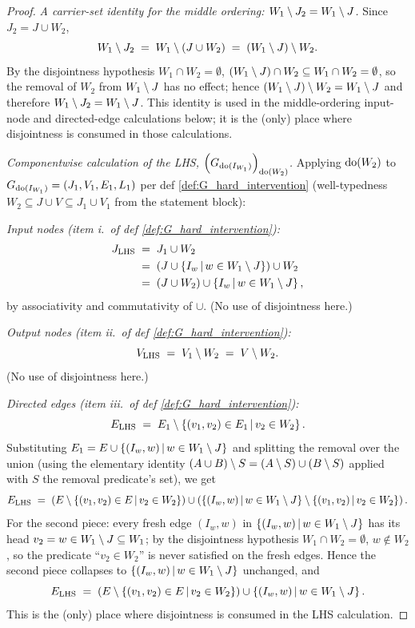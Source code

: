 \documentclass[main]{subfiles}
\begin{document}
\begin{proof}
\smallskip\noindent\emph{A carrier-set identity for the middle ordering: $W_1 \setminus J_2 = W_1 \setminus J$.}
Since $J_2 = J \cup W_2$,
\[
    W_1 \setminus J_2 \;=\; W_1 \setminus (J \cup W_2) \;=\; (W_1 \setminus J) \setminus W_2.
\]
By the disjointness hypothesis $W_1 \cap W_2 = \emptyset$, $(W_1 \setminus J) \cap W_2 \subseteq W_1 \cap W_2 = \emptyset$, so the removal of $W_2$ from $W_1 \setminus J$ has no effect; hence $(W_1 \setminus J) \setminus W_2 = W_1 \setminus J$ and therefore $W_1 \setminus J_2 = W_1 \setminus J$. This identity is used in the middle-ordering input-node and directed-edge calculations below; it is the (only) place where disjointness is consumed in those calculations.

\smallskip\noindent\emph{Componentwise calculation of the LHS, $\left ( G_{\operatorname{do}(I_{W_1})} \right )_{\operatorname{do}(W_2)}$.}
Applying $\operatorname{do}(W_2)$ to $G_{\operatorname{do}(I_{W_1})} = (J_1, V_1, E_1, L_1)$ per def \ref{def:G_hard_intervention} (well-typedness $W_2 \subseteq J \cup V \subseteq J_1 \cup V_1$ from the statement block):

\medskip\noindent\emph{Input nodes (item i.\ of def \ref{def:G_hard_intervention}):}
\begin{align*}
    J_{\mathrm{LHS}}
        &\;=\; J_1 \cup W_2 \\
        &\;=\; \left ( J \cup \left \{ I_w \,\middle|\, w \in W_1 \setminus J \right \} \right ) \cup W_2 \\
        &\;=\; (J \cup W_2) \cup \left \{ I_w \,\middle|\, w \in W_1 \setminus J \right \},
\end{align*}
by associativity and commutativity of $\cup$. (No use of disjointness here.)

\medskip\noindent\emph{Output nodes (item ii.\ of def \ref{def:G_hard_intervention}):}
\[
    V_{\mathrm{LHS}} \;=\; V_1 \setminus W_2 \;=\; V \setminus W_2.
\]
(No use of disjointness here.)

\medskip\noindent\emph{Directed edges (item iii.\ of def \ref{def:G_hard_intervention}):}
\[
    E_{\mathrm{LHS}} \;=\; E_1 \setminus \left \{ (v_1, v_2) \in E_1 \,\middle|\, v_2 \in W_2 \right \}.
\]
Substituting $E_1 = E \cup \left \{ (I_w, w) \,\middle|\, w \in W_1 \setminus J \right \}$ and splitting the removal over the union (using the elementary identity $(A \cup B) \setminus S = (A \setminus S) \cup (B \setminus S)$ applied with $S$ the removal predicate's set), we get
\[
    E_{\mathrm{LHS}} \;=\; \left ( E \setminus \left \{ (v_1, v_2) \in E \,\middle|\, v_2 \in W_2 \right \} \right ) \cup \left ( \left \{ (I_w, w) \,\middle|\, w \in W_1 \setminus J \right \} \setminus \left \{ (v_1, v_2) \,\middle|\, v_2 \in W_2 \right \} \right ).
\]
For the second piece: every fresh edge $(I_w, w)$ in $\left \{ (I_w, w) \,\middle|\, w \in W_1 \setminus J \right \}$ has its head $v_2 = w \in W_1 \setminus J \subseteq W_1$; by the disjointness hypothesis $W_1 \cap W_2 = \emptyset$, $w \notin W_2$, so the predicate ``$v_2 \in W_2$'' is never satisfied on the fresh edges. Hence the second piece collapses to $\left \{ (I_w, w) \,\middle|\, w \in W_1 \setminus J \right \}$ unchanged, and
\[
    E_{\mathrm{LHS}} \;=\; \left ( E \setminus \left \{ (v_1, v_2) \in E \,\middle|\, v_2 \in W_2 \right \} \right ) \cup \left \{ (I_w, w) \,\middle|\, w \in W_1 \setminus J \right \}.
\]
This is the (only) place where disjointness is consumed in the LHS calculation.


\end{proof}
\end{document}
